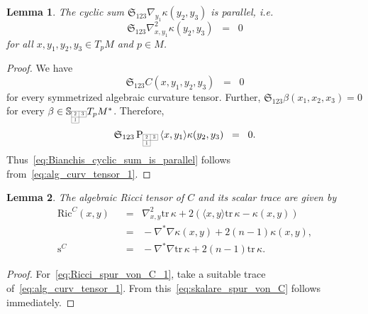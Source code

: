 \documentclass[11pt,a4paper]{article}
\theoremstyle{plain}
\newtheorem{lemma}{Lemma}
\theoremstyle{remark}
\newcommand{\cyclic}{\mathfrak{S}}
\newcommand{\Ric}{\mathrm{Ric}}
\newcommand{\trace}{\mathrm{tr}}
\newcommand{\scal}{\mathrm{s}}
\newcommand{\rmP}{\mathrm{P}}
\newcommand{\bbS}{\mathbb{S}}
\begin{document}
\bigskip
\begin{lemma}\label{le:Bianchis_cyclic_sum_is_parallel}
The cyclic sum $\cyclic_{123} \nabla_{y_1} \kappa (y_2,y_3)$ is parallel, i.e. 
\begin{equation}\label{eq:Bianchis_cyclic_sum_is_parallel}
 \cyclic_{123} \nabla^2_{x,y_1} \kappa (y_2,y_3)\;\;=\;\;0
\end{equation}
for all $x,y_1,y_2,y_3\in T_pM$ and $p\in M$.
\end{lemma}
\begin{proof}
We have
\[
 \cyclic_{123} C(x,y_1,y_2,y_3)\;\;=\;\;0
\]
for every symmetrized algebraic curvature tensor. Further, $\cyclic_{123}\beta(x_1,x_2,x_3) = 0$ for every $\beta\in \bbS_{\scaleto{\begin{array}{|c|c|}
\cline{1-2}
2 & 3 \\
\cline{1-2}
1 \\
\cline{1-1} 
\end{array}}{12pt}}T_pM^*$. Therefore,
\begin{align*}
\cyclic_{123}\, \rmP_{\scaleto{\begin{array}{|c|c|}
\cline{1-2}
2 & 3 \\
\cline{1-2}
1 \\
\cline{1-1} 
\end{array}}{12pt}}\,\langle x, y_1\rangle \kappa (y_2,y_3)\;\;=\;\;0.
\end{align*} Thus~\eqref{eq:Bianchis_cyclic_sum_is_parallel} follows from~\eqref{eq:alg_curv_tensor_1}.
\end{proof}


\bigskip
\begin{lemma}
The algebraic Ricci tensor of $C$ and its scalar trace are given by
\begin{align}\label{eq:Ricci_spur_von_C_1}
\Ric^C(x,y) &\;\;=\;\;\nabla^2_{x,y}\trace \, \kappa + 2(\langle x,y\rangle \trace \, \kappa - \kappa(x,y))\\
\label{eq:Ricci_spur_von_C_2}
&\;\;=\;\;- \nabla^*\nabla \kappa(x,y) + 2(n-1) \kappa(x,y),\\
\label{eq:skalare_spur_von_C}
\scal^C &\;\;=\;\;-\nabla^*\nabla\trace \, \kappa + 2(n-1)\trace \, \kappa.
\end{align}
\end{lemma}
\begin{proof}
For~\eqref{eq:Ricci_spur_von_C_1}, take a suitable trace of~\eqref{eq:alg_curv_tensor_1}. From this~\eqref{eq:skalare_spur_von_C} follows immediately.
\end{proof}
\end{document}
